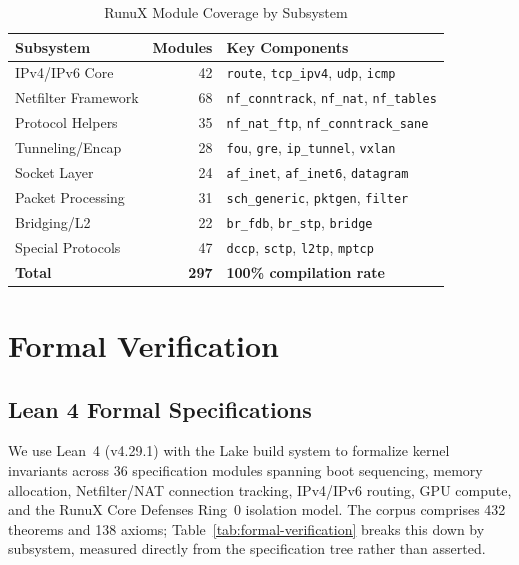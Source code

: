 \documentclass[sigconf,nonacm=false]{acmart}
\begin{document}
\begin{table}[t]
\caption{RunuX Module Coverage by Subsystem}
\label{tab:modules}
\small
\begin{tabular}{lrl}
\toprule
\textbf{Subsystem} & \textbf{Modules} & \textbf{Key Components} \\
\midrule
IPv4/IPv6 Core       & 42  & \texttt{route}, \texttt{tcp\_ipv4}, \texttt{udp}, \texttt{icmp} \\
Netfilter Framework   & 68  & \texttt{nf\_conntrack}, \texttt{nf\_nat}, \texttt{nf\_tables} \\
Protocol Helpers      & 35  & \texttt{nf\_nat\_ftp}, \texttt{nf\_conntrack\_sane} \\
Tunneling/Encap       & 28  & \texttt{fou}, \texttt{gre}, \texttt{ip\_tunnel}, \texttt{vxlan} \\
Socket Layer          & 24  & \texttt{af\_inet}, \texttt{af\_inet6}, \texttt{datagram} \\
Packet Processing     & 31  & \texttt{sch\_generic}, \texttt{pktgen}, \texttt{filter} \\
Bridging/L2           & 22  & \texttt{br\_fdb}, \texttt{br\_stp}, \texttt{bridge} \\
Special Protocols     & 47  & \texttt{dccp}, \texttt{sctp}, \texttt{l2tp}, \texttt{mptcp} \\
\midrule
\textbf{Total}        & \textbf{297} & \textbf{100\% compilation rate} \\
\bottomrule
\end{tabular}
\end{table}

\section{Formal Verification}
\label{sec:verification}

\subsection{Lean 4 Formal Specifications}
We use Lean~4 (v4.29.1) with the Lake build system to formalize kernel invariants across 36 specification modules spanning boot sequencing, memory allocation, Netfilter/NAT connection tracking, IPv4/IPv6 routing, GPU compute, and the RunuX Core Defenses Ring~0 isolation model. The corpus comprises 432 theorems and 138 axioms; Table~\ref{tab:formal-verification} breaks this down by subsystem, measured directly from the specification tree rather than asserted.
\end{document}
